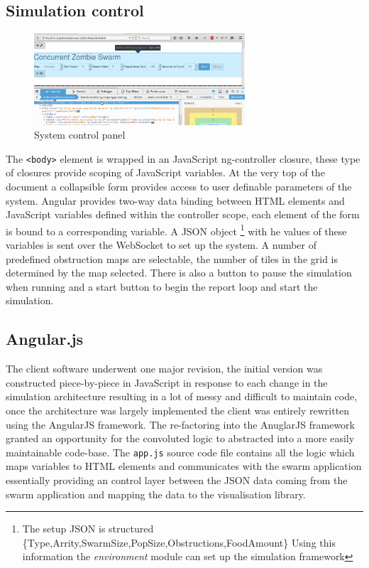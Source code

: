 \subsection{Simulation control}
\begin{figure}[h]
  \centering
  \includegraphics[width=0.7\textwidth]{img/panel.png}
\caption{System control panel}
    \label{fig:control-panel}
\end{figure}
The \verb+<body>+ element is wrapped in an JavaScript ng-controller closure, these type of closures provide scoping of JavaScript variables.
At the very top of the document a collapsible form provides access to user definable parameters of the system. Angular provides two-way data binding between HTML elements and JavaScript variables defined within the controller scope, each element of the form is bound to a corresponding variable.
A JSON object \footnote{The setup JSON is structured \{Type,Arrity,SwarmSize,PopSize,Obstructions,FoodAmount\} Using this information the \emph{environment} module can set up the simulation framework } with he values of these variables is sent over the WebSocket to set up the system. A number of predefined obstruction maps are selectable, the number of tiles in the grid is determined by the map selected. There is also a button to pause the simulation when running and a start button to begin the report loop and start the simulation.
\subsection{Angular.js}
The client software underwent one major revision, the initial version was constructed piece-by-piece in JavaScript in response to each change in the simulation architecture resulting in a lot of messy and difficult to maintain code, once the architecture was largely implemented the client was entirely rewritten using the AngularJS framework. The re-factoring into the AnuglarJS framework granted an opportunity for the convoluted logic to abstracted into a more easily maintainable code-base. The {\tt{app.js}}
source code file contains all the logic which maps variables to HTML elements and communicates with the swarm application essentially providing an control layer between the JSON data coming from the swarm application and mapping the data to the visualisation library.

